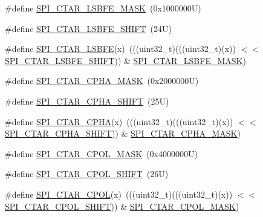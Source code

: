 \begin{DoxyCompactItemize}
\item 
\#define \mbox{\hyperlink{group___s_p_i___register___masks_gadefae41f4962681a83ae61a653026dc2}{S\+P\+I\+\_\+\+C\+T\+A\+R\+\_\+\+L\+S\+B\+F\+E\+\_\+\+M\+A\+SK}}~(0x1000000\+U)
\item 
\#define \mbox{\hyperlink{group___s_p_i___register___masks_ga5f3c8977a22e59cab407497ba5e32dc9}{S\+P\+I\+\_\+\+C\+T\+A\+R\+\_\+\+L\+S\+B\+F\+E\+\_\+\+S\+H\+I\+FT}}~(24\+U)
\item 
\#define \mbox{\hyperlink{group___s_p_i___register___masks_ga4c9cea463fa7641c820c5622500cd296}{S\+P\+I\+\_\+\+C\+T\+A\+R\+\_\+\+L\+S\+B\+FE}}(x)~(((uint32\+\_\+t)(((uint32\+\_\+t)(x)) $<$$<$ \mbox{\hyperlink{group___s_p_i___register___masks_ga5f3c8977a22e59cab407497ba5e32dc9}{S\+P\+I\+\_\+\+C\+T\+A\+R\+\_\+\+L\+S\+B\+F\+E\+\_\+\+S\+H\+I\+FT}})) \& \mbox{\hyperlink{group___s_p_i___register___masks_gadefae41f4962681a83ae61a653026dc2}{S\+P\+I\+\_\+\+C\+T\+A\+R\+\_\+\+L\+S\+B\+F\+E\+\_\+\+M\+A\+SK}})
\item 
\#define \mbox{\hyperlink{group___s_p_i___register___masks_ga562416b33f74ea5595e122d862093e51}{S\+P\+I\+\_\+\+C\+T\+A\+R\+\_\+\+C\+P\+H\+A\+\_\+\+M\+A\+SK}}~(0x2000000\+U)
\item 
\#define \mbox{\hyperlink{group___s_p_i___register___masks_ga1a27d47d54bd5b51d69b21216b3662b4}{S\+P\+I\+\_\+\+C\+T\+A\+R\+\_\+\+C\+P\+H\+A\+\_\+\+S\+H\+I\+FT}}~(25\+U)
\item 
\#define \mbox{\hyperlink{group___s_p_i___register___masks_ga967844b3614749fa16ce2ddc72549653}{S\+P\+I\+\_\+\+C\+T\+A\+R\+\_\+\+C\+P\+HA}}(x)~(((uint32\+\_\+t)(((uint32\+\_\+t)(x)) $<$$<$ \mbox{\hyperlink{group___s_p_i___register___masks_ga1a27d47d54bd5b51d69b21216b3662b4}{S\+P\+I\+\_\+\+C\+T\+A\+R\+\_\+\+C\+P\+H\+A\+\_\+\+S\+H\+I\+FT}})) \& \mbox{\hyperlink{group___s_p_i___register___masks_ga562416b33f74ea5595e122d862093e51}{S\+P\+I\+\_\+\+C\+T\+A\+R\+\_\+\+C\+P\+H\+A\+\_\+\+M\+A\+SK}})
\item 
\#define \mbox{\hyperlink{group___s_p_i___register___masks_ga128560de0ef72566ec53bb208e6ad5ef}{S\+P\+I\+\_\+\+C\+T\+A\+R\+\_\+\+C\+P\+O\+L\+\_\+\+M\+A\+SK}}~(0x4000000\+U)
\item 
\#define \mbox{\hyperlink{group___s_p_i___register___masks_gac46d6c45f2f45383d1f6d062a570e81d}{S\+P\+I\+\_\+\+C\+T\+A\+R\+\_\+\+C\+P\+O\+L\+\_\+\+S\+H\+I\+FT}}~(26\+U)
\item 
\#define \mbox{\hyperlink{group___s_p_i___register___masks_gad04548e76bbaa595940fc1d043cdbace}{S\+P\+I\+\_\+\+C\+T\+A\+R\+\_\+\+C\+P\+OL}}(x)~(((uint32\+\_\+t)(((uint32\+\_\+t)(x)) $<$$<$ \mbox{\hyperlink{group___s_p_i___register___masks_gac46d6c45f2f45383d1f6d062a570e81d}{S\+P\+I\+\_\+\+C\+T\+A\+R\+\_\+\+C\+P\+O\+L\+\_\+\+S\+H\+I\+FT}})) \& \mbox{\hyperlink{group___s_p_i___register___masks_ga128560de0ef72566ec53bb208e6ad5ef}{S\+P\+I\+\_\+\+C\+T\+A\+R\+\_\+\+C\+P\+O\+L\+\_\+\+M\+A\+SK}})
$$
\end{DoxyCompactItemize}
